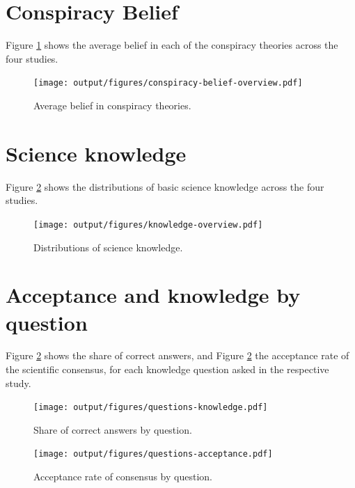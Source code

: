 \documentclass[
  doc,floatsintext]{apa6}
\begin{document}
\clearpage

\section{Conspiracy Belief}\label{conspiracy-belief}

Figure \ref{fig:conspiracy-belief-overview} shows the average belief in each of the conspiracy theories across the four studies.



\begin{figure}
\centering
\texttt{[image: output/figures/conspiracy-belief-overview.pdf]}
\caption{\label{fig:conspiracy-belief-overview}Average belief in conspiracy theories.}
\end{figure}

\clearpage

\section{Science knowledge}\label{knowledge}

Figure \ref{fig:knowledge-overview} shows the distributions of basic science knowledge across the four studies.



\begin{figure}
\centering
\texttt{[image: output/figures/knowledge-overview.pdf]}
\caption{\label{fig:knowledge-overview}Distributions of science knowledge.}
\end{figure}

\clearpage

\section{Acceptance and knowledge by question}\label{by-question-variation}

Figure \ref{fig:knowledge-overview} shows the share of correct answers, and Figure \ref{fig:knowledge-overview} the acceptance rate of the scientific consensus, for each knowledge question asked in the respective study.



\begin{figure}
\centering
\texttt{[image: output/figures/questions-knowledge.pdf]}
\caption{\label{fig:questions-knowledge}Share of correct answers by question.}
\end{figure}



\begin{figure}
\centering
\texttt{[image: output/figures/questions-acceptance.pdf]}
\caption{\label{fig:questions-acceptance}Acceptance rate of consensus by question.}
\end{figure}
\end{document}
